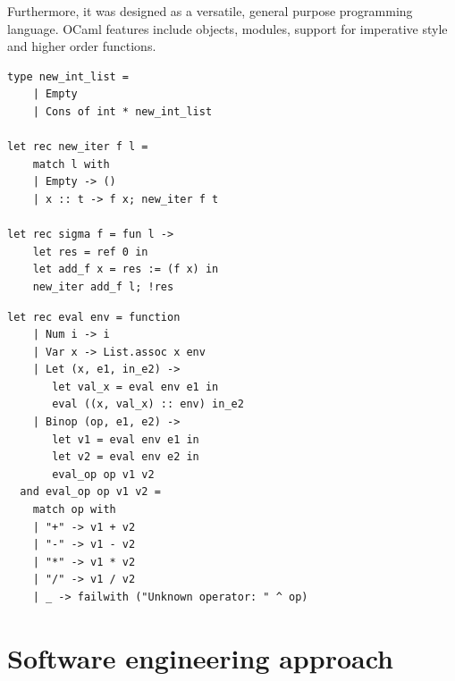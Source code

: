\documentclass[12pt,twoside,notitlepage]{report}
\theoremstyle{plain}%
\theoremstyle{definition}
\theoremstyle{remark}
\begin{document}
Furthermore, it was designed as a versatile, general purpose programming language. OCaml features include objects, modules, support for imperative style and higher order functions.
\vspace{3mm}

\begin{minipage}{\linewidth}

\begin{lstlisting}[caption={OCaml imperative function example}]
type new_int_list =
    | Empty
    | Cons of int * new_int_list
    
let rec new_iter f l = 
	match l with 
	| Empty -> ()
	| x :: t -> f x; new_iter f t

let rec sigma f = fun l -> 
    let res = ref 0 in 
    let add_f x = res := (f x) in 
    new_iter add_f l; !res
\end{lstlisting}

\end{minipage}

    
\begin{minipage}{\linewidth}

\begin{lstlisting}[caption={OCaml evaluation function example}]    
let rec eval env = function
    | Num i -> i
    | Var x -> List.assoc x env
    | Let (x, e1, in_e2) ->
       let val_x = eval env e1 in
       eval ((x, val_x) :: env) in_e2
    | Binop (op, e1, e2) ->
       let v1 = eval env e1 in
       let v2 = eval env e2 in
       eval_op op v1 v2
  and eval_op op v1 v2 =
    match op with
    | "+" -> v1 + v2
    | "-" -> v1 - v2
    | "*" -> v1 * v2
    | "/" -> v1 / v2
    | _ -> failwith ("Unknown operator: " ^ op)
\end{lstlisting}

\end{minipage}

\section{Software engineering approach}
\end{document}
